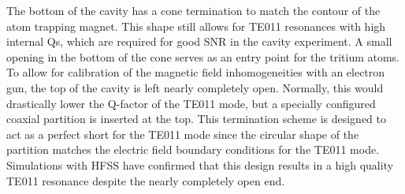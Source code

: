 The bottom of the cavity has a cone termination to match the contour of the atom trapping magnet. This shape still allows for TE011 resonances with high internal Qs, which are required for good SNR in the cavity experiment. A small opening in the bottom of the cone serves as an entry point for the tritium atoms. To allow for calibration of the magnetic field inhomogeneities with an electron gun, the top of the cavity is left nearly completely open. Normally, this would drastically lower the Q-factor of the TE011 mode, but a specially configured coaxial partition is inserted at the top. This termination scheme is designed to act as a perfect short for the TE011 mode since the circular shape of the partition matches the electric field boundary conditions for the TE011 mode. Simulations with HFSS have confirmed that this design results in a high quality TE011 resonance despite the nearly completely open end.
